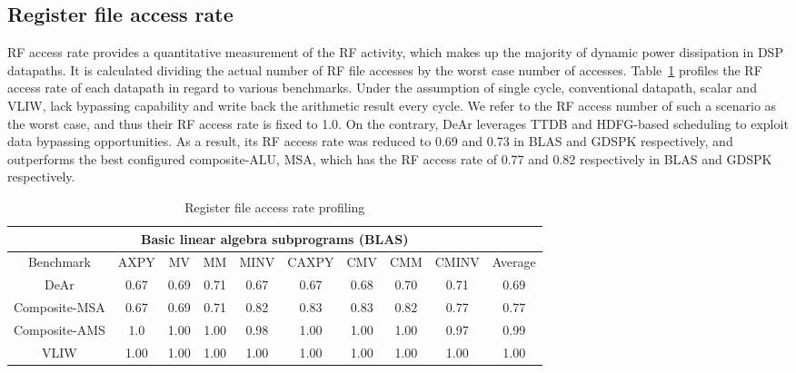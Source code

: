 {    \subsection{Register file access rate}
    RF access rate provides a quantitative measurement of the RF activity, 
    which makes up the majority of dynamic power dissipation in DSP datapaths.
    It is calculated dividing the actual number of RF file accesses by the worst case number of accesses.
    Table~\ref{tab:rpd} profiles the RF access rate of each datapath in regard to various benchmarks.
    Under the assumption of single cycle, conventional datapath, scalar and VLIW, 
    lack bypassing capability and write back the arithmetic result every cycle.
    We refer to the RF access number of such a scenario as the worst case, 
    and thus their RF access rate is fixed to 1.0.
    On the contrary, DeAr leverages TTDB and HDFG-based scheduling to exploit data bypassing opportunities. 
    As a result, its RF access rate was reduced to 0.69 and 0.73 in BLAS and GDSPK respectively, 
    and outperforms the best configured composite-ALU, MSA, which has the RF access rate of 0.77 and 0.82 respectively in BLAS and GDSPK respectively.
    \begin{table}[!ht]
        \centering
        \caption{Register file access rate profiling}
        \label{tab:rpd}
        \resizebox{\columnwidth}{!}
        {
            \begin{tabular}{|c|c|c|c|c|c|c|c|c|c|}
                \hline
                \multicolumn{10}{|c|}{\textbf{Basic linear algebra subprograms (BLAS)}} \\ \hline
                Benchmark  &  AXPY  &  MV  &  MM  &  MINV  &  CAXPY  &  CMV  &  CMM  &  CMINV  &  Average \\ \hline 
                DeAr  &   0.67  &   0.69  &   0.71  &   0.67  &   0.67  &   0.68  &   0.70  &   0.71  &   0.69     \\ \hline
                Composite-MSA  &   0.67  &   0.69  &  0.71  &   0.82  &   0.83  &   0.83  &   0.82  &   0.77  &  0.77     \\ \hline 
                Composite-AMS  &   1.0  &   1.00  &   1.00  &   0.98  &   1.00  &   1.00  &   1.00  &   0.97  &   0.99     \\ \hline 
                VLIW  &   1.00  &   1.00  &   1.00  &   1.00  &   1.00  &   1.00  &   1.00  &   1.00  &   1.00     \\ \hline 

\end{tabular}}
\end{table}}
